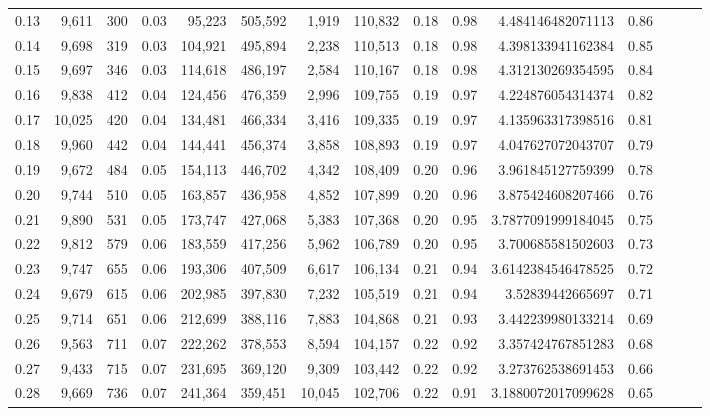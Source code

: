 \begin{tabular}{rrrrrrrrrrrrrrr}
0.13 &   9,611 &    300 &  0.03 &   95,223 &  505,592 &    1,919 &  110,832 &  0.18 &  0.98 &       4.484146482071113 &      0.86 \\
0.14 &   9,698 &    319 &  0.03 &  104,921 &  495,894 &    2,238 &  110,513 &  0.18 &  0.98 &       4.398133941162384 &      0.85 \\
0.15 &   9,697 &    346 &  0.03 &  114,618 &  486,197 &    2,584 &  110,167 &  0.18 &  0.98 &       4.312130269354595 &      0.84 \\
0.16 &   9,838 &    412 &  0.04 &  124,456 &  476,359 &    2,996 &  109,755 &  0.19 &  0.97 &       4.224876054314374 &      0.82 \\
0.17 &  10,025 &    420 &  0.04 &  134,481 &  466,334 &    3,416 &  109,335 &  0.19 &  0.97 &       4.135963317398516 &      0.81 \\
0.18 &   9,960 &    442 &  0.04 &  144,441 &  456,374 &    3,858 &  108,893 &  0.19 &  0.97 &       4.047627072043707 &      0.79 \\
0.19 &   9,672 &    484 &  0.05 &  154,113 &  446,702 &    4,342 &  108,409 &  0.20 &  0.96 &       3.961845127759399 &      0.78 \\
0.20 &   9,744 &    510 &  0.05 &  163,857 &  436,958 &    4,852 &  107,899 &  0.20 &  0.96 &       3.875424608207466 &      0.76 \\
0.21 &   9,890 &    531 &  0.05 &  173,747 &  427,068 &    5,383 &  107,368 &  0.20 &  0.95 &      3.7877091999184045 &      0.75 \\
0.22 &   9,812 &    579 &  0.06 &  183,559 &  417,256 &    5,962 &  106,789 &  0.20 &  0.95 &       3.700685581502603 &      0.73 \\
0.23 &   9,747 &    655 &  0.06 &  193,306 &  407,509 &    6,617 &  106,134 &  0.21 &  0.94 &      3.6142384546478525 &      0.72 \\
0.24 &   9,679 &    615 &  0.06 &  202,985 &  397,830 &    7,232 &  105,519 &  0.21 &  0.94 &        3.52839442665697 &      0.71 \\
0.25 &   9,714 &    651 &  0.06 &  212,699 &  388,116 &    7,883 &  104,868 &  0.21 &  0.93 &       3.442239980133214 &      0.69 \\
0.26 &   9,563 &    711 &  0.07 &  222,262 &  378,553 &    8,594 &  104,157 &  0.22 &  0.92 &       3.357424767851283 &      0.68 \\
0.27 &   9,433 &    715 &  0.07 &  231,695 &  369,120 &    9,309 &  103,442 &  0.22 &  0.92 &       3.273762538691453 &      0.66 \\
0.28 &   9,669 &    736 &  0.07 &  241,364 &  359,451 &   10,045 &  102,706 &  0.22 &  0.91 &      3.1880072017099628 &      0.65 \\

\end{tabular}
